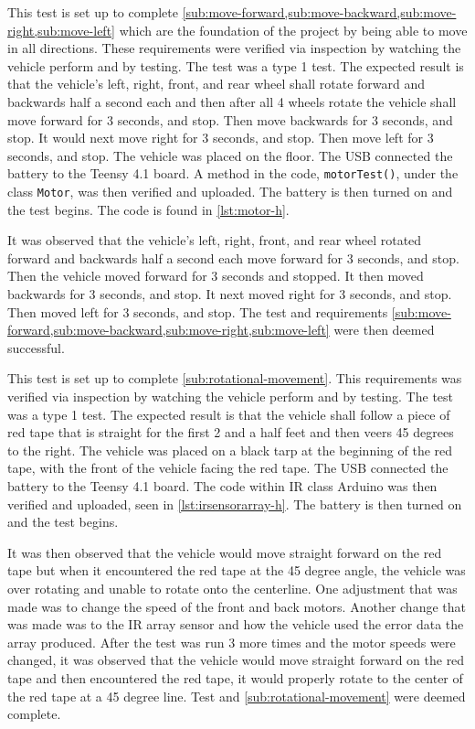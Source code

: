 \documentclass[11pt]{report}
\begin{document}
\label{tst:basic-directional-movement}
This test is set up to complete \cref{sub:move-forward,sub:move-backward,sub:move-right,sub:move-left} which are the foundation of the project by being able to move in all directions. These requirements were verified via inspection by watching the vehicle perform and by testing. The test was a type 1 test. The expected result is that the vehicle’s left, right, front, and rear wheel shall rotate forward and backwards half a second each and then after all 4 wheels rotate the vehicle shall move forward for 3 seconds, and stop. Then move backwards for 3 seconds, and stop. It would next move right for 3 seconds, and stop. Then move left for 3 seconds, and stop. The vehicle was placed on the floor. The USB connected the battery to the Teensy 4.1 board. A method in the code, \texttt{motorTest()}, under the class \texttt{Motor}, was then verified and uploaded. The battery is then turned on and the test begins. The code is found in \cref{lst:motor-h}.

It was observed that the vehicle’s left, right, front, and rear wheel rotated forward and backwards half a second each move forward for 3 seconds, and stop. Then the vehicle moved forward for 3 seconds and stopped. It then moved backwards for 3 seconds, and stop. It next moved right for 3 seconds, and stop. Then moved left for 3 seconds, and stop. The test and requirements \cref{sub:move-forward,sub:move-backward,sub:move-right,sub:move-left} were then deemed successful.

\label{tst:rotational-movement}
This test is set up to complete \cref{sub:rotational-movement}. This requirements was verified via inspection by watching the vehicle perform and by testing. The test was a type 1 test. The expected result is that the vehicle shall follow a piece of red tape that is straight for the first 2 and a half feet and then veers 45 degrees to the right. The vehicle was placed on a black tarp at the beginning of the red tape, with the front of the vehicle facing the red tape. The USB connected the battery to the Teensy 4.1 board. The code within \gls{IR} class Arduino was then verified and uploaded, seen in \cref{lst:irsensorarray-h}. The battery is then turned on and the test begins. 

It was then observed that the vehicle would move straight forward on the red tape but when it encountered the red tape at the 45 degree angle, the vehicle was over rotating and unable to rotate onto the centerline. One adjustment that was made was to change the speed of the front and back motors. Another change that was made was to the \gls{IR} array sensor and how the vehicle used the error data the array produced. After the test was run 3 more times and the motor speeds were changed, it was observed that the vehicle would move straight forward on the red tape and  then encountered the red tape, it would properly rotate to the center of the red tape at a 45 degree line. Test and \cref{sub:rotational-movement} were deemed complete. 
\end{document}
